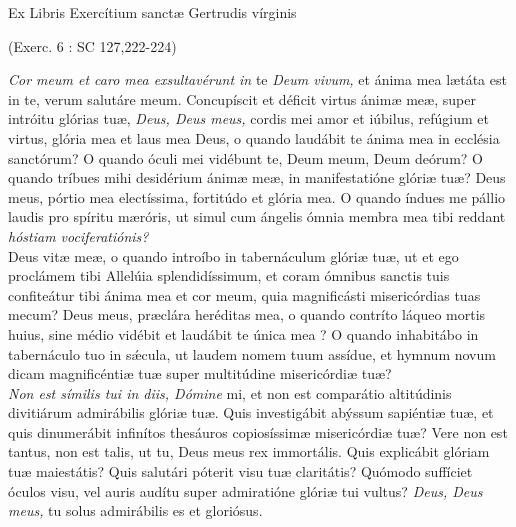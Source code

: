 \documentclass[options]{article}
\begin{document}
	Ex Libris Exercítium sanctæ Gertrudis vírginis
\begin{flushright}
	(Exerc. 6 : SC 127,222-224)	
\end{flushright}	
	\emph{Cor meum et caro mea exsultavérunt in} te \emph{Deum vivum,} et ánima mea lætáta est in te, verum salutáre meum. Concupíscit et déficit virtus ánimæ meæ, super intróitu glórias tuæ, \emph{Deus, Deus meus,} cordis mei amor et iúbilus, refúgium et virtus, glória mea et laus mea Deus, o quando laudábit te ánima mea in ecclésia sanctórum? O quando óculi mei vidébunt te, Deum meum, Deum deórum? O quando tríbues mihi desidérium ánimæ meæ, in manifestatióne glóriæ tuæ? Deus meus, pórtio mea electíssima, fortitúdo et glória mea. O quando índues me pállio laudis pro spíritu mæróris, ut simul cum ángelis ómnia membra mea tibi reddant \emph{hóstiam vociferatiónis?}\\
	 Deus vitæ meæ, o quando introíbo in tabernáculum glóriæ tuæ, ut et ego proclámem tibi Allelúia splendidíssimum, et coram ómnibus sanctis tuis confiteátur tibi ánima mea et cor meum, quia magnificásti misericórdias tuas mecum? Deus meus, præclára heréditas mea, o quando contríto láqueo mortis huius, sine médio vidébit et laudábit te única mea ? O quando inhabitábo in tabernáculo tuo in s\'{æ}cula, ut laudem nomem tuum assídue, et hymnum novum dicam magnificéntiæ tuæ super multitúdine misericórdiæ tuæ?\\
	\emph{Non est símilis tui in diis, Dómine} mi, et non est comparátio altitúdinis divitiárum admirábilis glóriæ tuæ. Quis investigábit abýssum sapiéntiæ tuæ, et quis dinumerábit infinítos thesáuros copiosíssimæ misericórdiæ tuæ? Vere non est tantus, non est talis, ut tu, Deus meus rex immortális. Quis explicábit glóriam tuæ maiestátis? Quis salutári póterit visu tuæ claritátis? Quómodo suffíciet óculos visu, vel auris audítu super admiratióne glóriæ tui vultus? \emph{Deus, Deus meus,}  tu solus admirábilis es et gloriósus.
\end{document}
